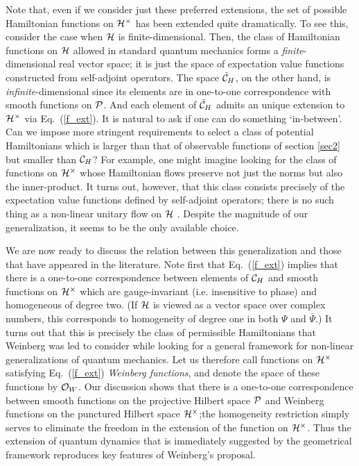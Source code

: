 \documentclass[12pt,aps,eqsecnum,tighten,nofootinbib]{revtex4-2}
\def\H{{\cal H}}
\def\punctH{{\cal H}^{\times}}
\def\P{{\cal P}}
\def\ch{{\cal C}_H}
\begin{document}
Note that, even if we consider just these preferred extensions, the
set of possible Hamiltonian functions on $\punctH$ has been extended
quite dramatically.  To see this, consider the case when $\H$ is
finite-dimensional. Then, the class of Hamiltonian functions on $\H$
allowed in standard quantum mechanics forms a {\it finite}-dimensional
real vector space; it is just the space of expectation value functions
constructed from self-adjoint operators. The space $\tilde\ch$, on the
other hand, is {\it infinite}-dimensional since its elements are in
one-to-one correspondence with smooth functions on $\P$. And each
element of $\tilde\ch$ admits an unique extension to $\punctH$ via
Eq.~(\ref{f_ext}). It is natural to ask if one can do something
`in-between'. Can we impose more stringent requirements to select a
class of potential Hamiltonians which is larger than that of
observable functions of section \ref{sec2} but smaller than $\ch$?
For example, one might imagine looking for the class of functions on
$\punctH$ whose Hamiltonian flows preserve not just the norms but also
the inner-product. It turns out, however, that this class consists
precisely of the expectation value functions defined by self-adjoint
operators; there is no such thing as a non-linear unitary flow on $\H$
\cite{thesis}. Despite the magnitude of our generalization, it seems
to be the only available choice.

We are now ready to discuss the relation between this generalization
and those that have appeared in the literature. Note first that
Eq.~(\ref{f_ext}) implies that there is a one-to-one correspondence
between elements of $\ch$ and smooth functions on $\punctH$ which are
gauge-invariant (i.e. insensitive to phase) and homogeneous of degree
two. (If $\H$ is viewed as a vector space over complex numbers, this
corresponds to homogeneity of degree one in both $\Psi$ and
$\bar{\Psi}$.)  It turns out that this is precisely the class of
permissible Hamiltonians that Weinberg \cite{weinberg} was led to
consider while looking for a general framework for non-linear
generalizations of quantum mechanics. Let us therefore call functions
on $\punctH$ satisfying Eq.~(\ref{f_ext}) {\em Weinberg functions},
and denote the space of these functions by ${\cal O}_W$. Our
discussion shows that there is a one-to-one correspondence between
smooth functions on the projective Hilbert space $\P$ and Weinberg
functions on the punctured Hilbert space $\punctH$;the homogeneity
restriction simply serves to eliminate the freedom in the extension of
the function on $\punctH$.  Thus the extension of quantum dynamics
that is immediately suggested by the geometrical framework reproduces
key features of Weinberg's proposal.
\end{document}

